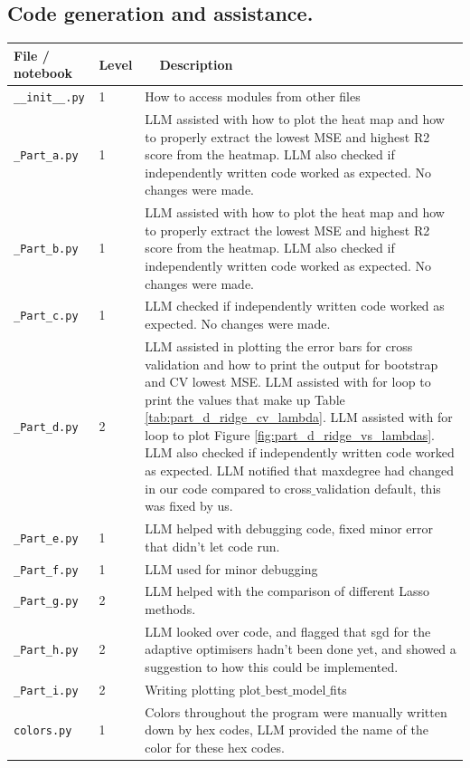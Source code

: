 \documentclass[reprint,english,notitlepage]{revtex4-2}  %
\begin{document}
\subsection{\textbf{Code generation and assistance.}}
\begin{tabular}{llp{11cm}}
File / notebook & Level & \ \ Description\\ \hline
\texttt{\_\_init\_\_.py} & 1 & How to access modules from other files  \\
\texttt{\_Part\_a.py} &  1 & LLM assisted with how to plot the heat map and how to properly extract the lowest MSE and highest R2 score from the heatmap. LLM also checked if independently written code worked as expected. No changes were made. \\
\texttt{\_Part\_b.py} & 1 & LLM assisted with how to plot the heat map and how to properly extract the lowest MSE and highest R2 score from the heatmap.  LLM also checked if independently written code worked as expected. No changes were made. \\
\texttt{\_Part\_c.py} & 1 & LLM checked if independently written code worked as expected. No changes were made. \\
\texttt{\_Part\_d.py} & 2 & LLM assisted in plotting the error bars for cross validation and how to print the output for bootstrap and CV lowest MSE. LLM assisted with for loop to print the values that make up Table \ref{tab:part_d_ridge_cv_lambda}. LLM assisted with for loop to plot Figure \ref{fig:part_d_ridge_vs_lambdas}. LLM also checked if independently written code worked as expected. LLM notified that maxdegree had changed in our code compared to cross$\_$validation default, this was fixed by us.\\ 
\texttt{\_Part\_e.py} & 1 & LLM helped with debugging code, fixed minor error that didn't let code run.\\ 
\texttt{\_Part\_f.py} & 1 & LLM used for minor debugging \\ 
\texttt{\_Part\_g.py} & 2 & LLM helped with the comparison of different Lasso methods. \\
\texttt{\_Part\_h.py} & 2 & LLM looked over code, and flagged that sgd for the adaptive optimisers hadn't been done yet, and showed a suggestion to how this could be implemented. \\
\texttt{\_Part\_i.py} & 2 & Writing plotting plot$\_$best$\_$model$\_$fits\\
\texttt{colors.py} & 1 & Colors throughout the program were manually written down by hex codes, LLM provided the name of the color for these hex codes. \\

\end{tabular}
\end{document}
